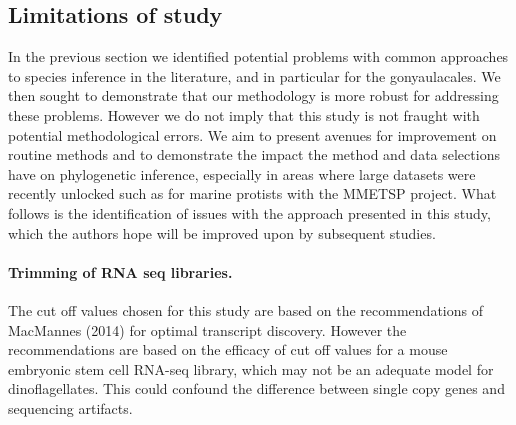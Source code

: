 \documentclass[12pt]{article}
\begin{document}
\subsection*{Limitations of study}
In the previous section we identified potential problems with common approaches to species inference in the literature, and in particular for the gonyaulacales. 
We then sought to demonstrate that our methodology is more robust for addressing these problems. 
However we do not imply that this study is not fraught with potential methodological errors. 
We aim to present avenues for improvement on routine methods and to demonstrate the impact the method and data selections have on phylogenetic inference, especially in areas where large datasets were recently unlocked such as for marine protists with the MMETSP project. %
What follows is the identification of issues with the approach presented in this study, which the authors hope will be improved upon by subsequent studies. 
\paragraph*{Trimming of RNA seq libraries.} The cut off values chosen for this study are based on the recommendations of MacMannes (2014) for optimal transcript discovery. 
However the recommendations are based on the efficacy of cut off values for a mouse embryonic stem cell RNA-seq library, which may not be an adequate model for dinoflagellates. 
This could confound the difference between single copy genes and sequencing artifacts.
\end{document}
